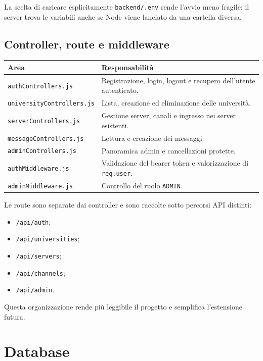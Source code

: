 \documentclass[11pt,a4paper]{article}
\begin{document}
La scelta di caricare esplicitamente \texttt{backend/.env} rende l'avvio meno fragile: il server trova le variabili anche se Node viene lanciato da una cartella diversa.

\subsection{Controller, route e middleware}

\begin{longtable}{>{\raggedright\arraybackslash}p{}>{\raggedright\arraybackslash}p{}}
\hline
\textbf{Area} & \textbf{Responsabilità} \\
\hline
\texttt{authControllers.js} & Registrazione, login, logout e recupero dell'utente autenticato. \\
\texttt{universityControllers.js} & Lista, creazione ed eliminazione delle università. \\
\texttt{serverControllers.js} & Gestione server, canali e ingresso nei server esistenti. \\
\texttt{messageControllers.js} & Lettura e creazione dei messaggi. \\
\texttt{adminControllers.js} & Panoramica admin e cancellazioni protette. \\
\texttt{authMiddleware.js} & Validazione del bearer token e valorizzazione di \texttt{req.user}. \\
\texttt{adminMiddleware.js} & Controllo del ruolo \texttt{ADMIN}. \\
\hline
\end{longtable}

Le route sono separate dai controller e sono raccolte sotto percorsi API distinti:

\begin{itemize}
  \item \texttt{/api/auth};
  \item \texttt{/api/universities};
  \item \texttt{/api/servers};
  \item \texttt{/api/channels};
  \item \texttt{/api/admin}.
\end{itemize}

Questa organizzazione rende più leggibile il progetto e semplifica l'estensione futura.

\section{Database}
\end{document}
